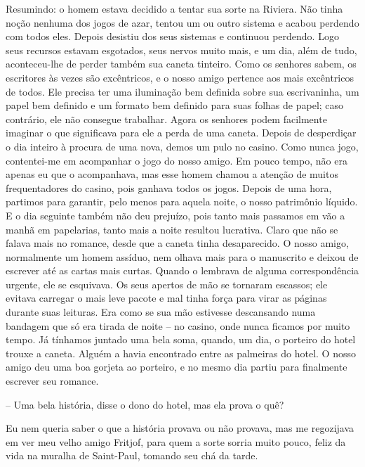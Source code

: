 Resumindo: o homem estava decidido a tentar sua sorte na Riviera. Não
tinha noção nenhuma dos jogos de azar, tentou um ou outro sistema e
acabou perdendo com todos eles. Depois desistiu dos seus sistemas e
continuou perdendo. Logo seus recursos estavam esgotados, seus nervos
muito mais, e um dia, além de tudo, aconteceu-lhe de perder também sua
caneta tinteiro. Como os senhores sabem, os escritores às vezes são
excêntricos, e o nosso amigo pertence aos mais excêntricos de todos. Ele
precisa ter uma iluminação bem definida sobre sua escrivaninha, um papel
bem definido e um formato bem definido para suas folhas de papel; caso
contrário, ele não consegue trabalhar. Agora os senhores podem
facilmente imaginar o que significava para ele a perda de uma caneta.
Depois de desperdiçar o dia inteiro à procura de uma nova, demos um pulo
no casino. Como nunca jogo, contentei-me em acompanhar o jogo do nosso
amigo. Em pouco tempo, não era apenas eu que o acompanhava, mas esse
homem chamou a atenção de muitos frequentadores do casino, pois ganhava
todos os jogos. Depois de uma hora, partimos para garantir, pelo menos
para aquela noite, o nosso patrimônio líquido. E o dia seguinte também
não deu prejuízo, pois tanto mais passamos em vão a manhã em papelarias,
tanto mais a noite resultou lucrativa. Claro que não se falava mais no
romance, desde que a caneta tinha desaparecido. O nosso amigo,
normalmente um homem assíduo, nem olhava mais para o manuscrito e deixou
de escrever até as cartas mais curtas. Quando o lembrava de alguma
correspondência urgente, ele se esquivava. Os seus apertos de mão se
tornaram escassos; ele evitava carregar o mais leve pacote e mal tinha
força para virar as páginas durante suas leituras. Era como se sua mão
estivesse descansando numa bandagem que só era tirada de noite -- no
casino, onde nunca ficamos por muito tempo. Já tínhamos juntado uma bela
soma, quando, um dia, o porteiro do hotel trouxe a caneta. Alguém a
havia encontrado entre as palmeiras do hotel. O nosso amigo deu uma boa
gorjeta ao porteiro, e no mesmo dia partiu para finalmente escrever seu
romance.

-- Uma bela história, disse o dono do hotel, mas ela prova o quê?

Eu nem queria saber o que a história provava ou não provava, mas me
regozijava em ver meu velho amigo Fritjof, para quem a sorte sorria
muito pouco, feliz da vida na muralha de Saint-Paul, tomando seu chá da
tarde.

